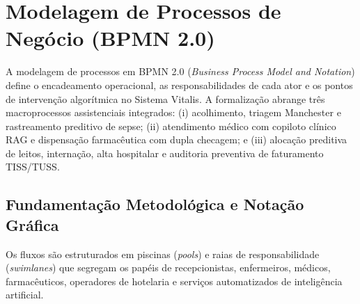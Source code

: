 
\section{Modelagem de Processos de Negócio (BPMN 2.0)}
\label{sec:bpmn}

A modelagem de processos em BPMN 2.0 (\textit{Business Process Model and Notation}) \cite{omg_bpmn:2011} define o encadeamento operacional, as responsabilidades de cada ator e os pontos de intervenção algorítmica no Sistema Vitalis. A formalização abrange três macroprocessos assistenciais integrados: (i) acolhimento, triagem Manchester e rastreamento preditivo de sepse; (ii) atendimento médico com copiloto clínico RAG e dispensação farmacêutica com dupla checagem; e (iii) alocação preditiva de leitos, internação, alta hospitalar e auditoria preventiva de faturamento TISS/TUSS.

\subsection{Fundamentação Metodológica e Notação Gráfica}
\label{subsec:bpmn_fundamentacao}

Os fluxos são estruturados em piscinas (\textit{pools}) e raias de responsabilidade (\textit{swimlanes}) que segregam os papéis de recepcionistas, enfermeiros, médicos, farmacêuticos, operadores de hotelaria e serviços automatizados de inteligência artificial.

